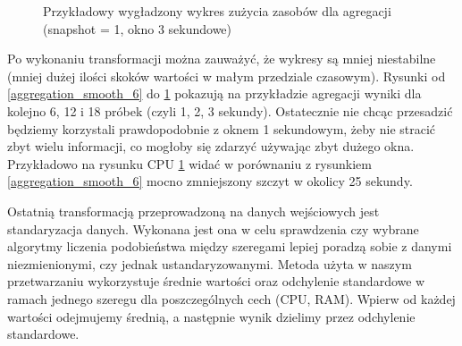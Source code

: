 \begin{figure}[H]
  \centering
  \hfill
  \caption{Przykładowy wygładzony wykres zużycia zasobów dla agregacji (snapshot = 1, okno 3 sekundowe)}
  \label{aggregation_smooth_18}
\end{figure}

Po wykonaniu transformacji można zauważyć, że wykresy są mniej niestabilne (mniej dużej ilości skoków wartości w małym przedziale czasowym). Rysunki od \ref{aggregation_smooth_6} do \ref{aggregation_smooth_18} pokazują na przykładzie agregacji wyniki dla kolejno 6, 12 i 18 próbek (czyli 1, 2, 3 sekundy). Ostatecznie nie chcąc przesadzić będziemy korzystali prawdopodobnie z oknem 1 sekundowym, żeby nie stracić zbyt wielu informacji, co mogłoby się zdarzyć używając zbyt dużego okna. Przykładowo na rysunku CPU \ref{aggregation_smooth_18} widać w porównaniu z rysunkiem \ref{aggregation_smooth_6} mocno zmniejszony szczyt w okolicy 25 sekundy.

Ostatnią transformacją przeprowadzoną na danych wejściowych jest standaryzacja danych. Wykonana jest ona w celu sprawdzenia czy wybrane algorytmy liczenia podobieństwa między szeregami lepiej poradzą sobie z danymi niezmienionymi, czy jednak ustandaryzowanymi. Metoda użyta w naszym przetwarzaniu wykorzystuje średnie wartości oraz odchylenie standardowe w ramach jednego szeregu dla poszczególnych cech (CPU, RAM). Wpierw od każdej wartości odejmujemy średnią, a następnie wynik dzielimy przez odchylenie standardowe.

